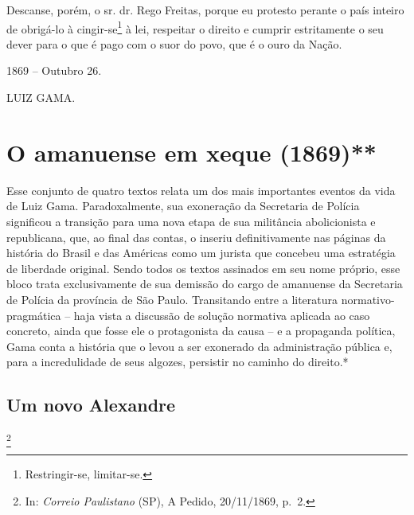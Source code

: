Descanse, porém, o sr. dr. Rego Freitas, porque eu protesto perante o
país inteiro de obrigá-lo à cingir-se\footnote{Restringir-se,
  limitar-se.} à lei, respeitar o direito e cumprir estritamente o seu
dever para o que é pago com o suor do povo, que é o ouro da Nação.

1869 -- Outubro 26.

LUIZ GAMA.

\part{O amanuense em xeque (1869)**}

\begin{didascalia}
Esse conjunto de quatro textos relata um dos mais importantes eventos da
vida de Luiz Gama. Paradoxalmente, sua exoneração da Secretaria de
Polícia significou a transição para uma nova etapa de sua militância
abolicionista e republicana, que, ao final das contas, o inseriu
definitivamente nas páginas da história do Brasil e das Américas como um
jurista que concebeu uma estratégia de liberdade original. Sendo todos
os textos assinados em seu nome próprio, esse bloco trata exclusivamente
de sua demissão do cargo de amanuense da Secretaria de Polícia da
província de São Paulo. Transitando entre a literatura
normativo-pragmática -- haja vista a discussão de solução normativa
aplicada ao caso concreto, ainda que fosse ele o protagonista da causa
-- e a propaganda política, Gama conta a história que o levou a ser
exonerado da administração pública e, para a incredulidade de seus
algozes, persistir no caminho do direito.*
\end{didascalia}

\chapter{Um novo Alexandre}\footnote{In: \emph{Correio Paulistano} (SP), A
  Pedido, 20/11/1869, p.~2.}

